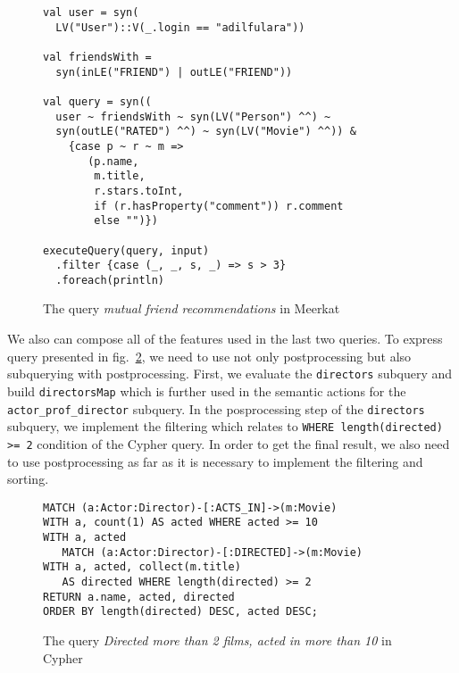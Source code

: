 \begin{figure}[h]
\begin{lstlisting}
val user = syn(
  LV("User")::V(_.login == "adilfulara"))

val friendsWith = 
  syn(inLE("FRIEND") | outLE("FRIEND"))

val query = syn((
  user ~ friendsWith ~ syn(LV("Person") ^^) ~
  syn(outLE("RATED") ^^) ~ syn(LV("Movie") ^^)) &
    {case p ~ r ~ m => 
       (p.name, 
        m.title, 
        r.stars.toInt,
        if (r.hasProperty("comment")) r.comment 
        else "")})
 
executeQuery(query, input)
  .filter {case (_, _, s, _) => s > 3} 
  .foreach(println)

\end{lstlisting}
\caption{The query \emph{mutual friend recommendations} in Meerkat}
\label{fig:Q4_M}
\end{figure}

We also can compose all of the features used in the last two queries. 
To express query presented in fig.~\ref{fig:Q3_C}, we need to use not only postprocessing but also subquerying with postprocessing.
First, we evaluate the \lstinline{directors} subquery and build \lstinline{directorsMap} which is further used in the semantic actions for the \lstinline{actor_prof_director} subquery.
In the posprocessing step of the \lstinline{directors} subquery, we implement the filtering which relates to \lstinline{WHERE length(directed) >= 2} condition of the Cypher query.
In order to get the final result, we also need to use postprocessing as far as it is necessary to implement the filtering and sorting.

\begin{figure}[h]
\begin{lstlisting}
MATCH (a:Actor:Director)-[:ACTS_IN]->(m:Movie)
WITH a, count(1) AS acted WHERE acted >= 10
WITH a, acted 
   MATCH (a:Actor:Director)-[:DIRECTED]->(m:Movie)
WITH a, acted, collect(m.title) 
   AS directed WHERE length(directed) >= 2
RETURN a.name, acted, directed
ORDER BY length(directed) DESC, acted DESC;
\end{lstlisting}
\caption{The query \emph{Directed more than 2 films, acted in more than 10} in Cypher}
\label{fig:Q3_C}
\end{figure}


